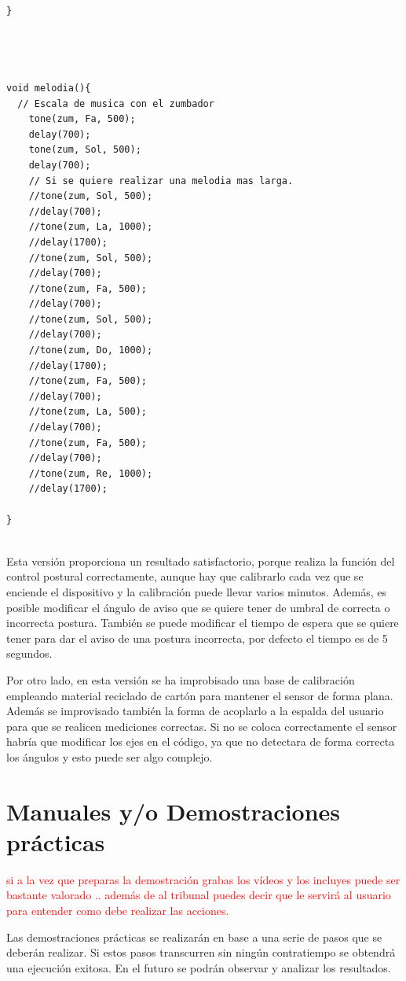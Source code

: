 \begin{lstlisting}
}




void melodia(){
  // Escala de musica con el zumbador
    tone(zum, Fa, 500);
    delay(700);
    tone(zum, Sol, 500);
    delay(700);
    // Si se quiere realizar una melodia mas larga.
    //tone(zum, Sol, 500);
    //delay(700);
    //tone(zum, La, 1000);
    //delay(1700);
    //tone(zum, Sol, 500);
    //delay(700);
    //tone(zum, Fa, 500);
    //delay(700);
    //tone(zum, Sol, 500);
    //delay(700);
    //tone(zum, Do, 1000);
    //delay(1700);
    //tone(zum, Fa, 500);
    //delay(700);
    //tone(zum, La, 500);
    //delay(700);
    //tone(zum, Fa, 500);
    //delay(700);
    //tone(zum, Re, 1000);
    //delay(1700);
    
}


\end{lstlisting}

Esta versión proporciona un resultado satisfactorio, porque realiza la función del control postural correctamente, aunque hay que calibrarlo cada vez que se enciende el dispositivo y la calibración puede llevar varios minutos. Además, es posible modificar el ángulo de aviso que se quiere tener de umbral de correcta o incorrecta postura. También se puede modificar el tiempo de espera que se quiere tener para dar el aviso de una postura incorrecta, por defecto el tiempo es de 5 segundos.

Por otro lado, en esta versión se ha improbisado una base de calibración empleando material reciclado de cartón para mantener el sensor de forma plana. Además se improvisado también la forma de acoplarlo a la espalda del usuario para que se realicen mediciones correctas. Si no se coloca correctamente el sensor habría que modificar los ejes en el código, ya que no detectara de forma correcta los ángulos y esto puede ser algo complejo.


\newpage
\section{Manuales y/o Demostraciones prácticas}

\textcolor{red}{si a la vez que preparas la demostración grabas los vídeos y los incluyes puede ser bastante valorado .. además de al tribunal puedes decir que le servirá al usuario para entender como debe realizar las acciones.}

Las demostraciones prácticas se realizarán en base a una serie de pasos que se deberán realizar. Si estos pasos transcurren sin ningún contratiempo se obtendrá una ejecución exitosa. En el futuro se podrán observar y analizar los resultados.

